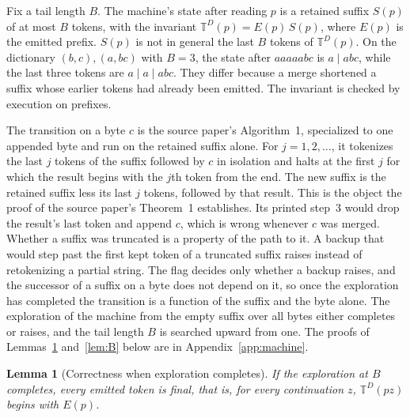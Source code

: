 \documentclass[11pt,a4paper]{article}
\theoremstyle{definition}
\theoremstyle{plain}
\newtheorem{lemma}{Lemma}
\newcommand{\T}{\mathbb{T}}
\begin{document}
Fix a tail length \(B\). The machine's state after reading \(p\) is a retained suffix \(S(p)\) of at most \(B\) tokens,
with the invariant \(\T^D(p) = E(p)\,S(p)\), where \(E(p)\) is the emitted prefix. \(S(p)\) is not in general the last
\(B\) tokens of \(\T^D(p)\). On the dictionary \((b,c), (a,bc)\) with \(B = 3\), the state after \(aaaaabc\) is
\(a \mid abc\), while the last three tokens are \(a \mid a \mid abc\). They differ because a merge shortened a suffix
whose earlier tokens had already been emitted. The invariant is checked by execution on \EmittedPrefixes{} prefixes.

The transition on a byte \(c\) is the source paper's Algorithm~1, specialized to one appended byte and run on the
retained suffix alone. For \(j = 1, 2, \dots\), it tokenizes the last \(j\) tokens of the suffix followed by \(c\) in
isolation and halts at the first \(j\) for which the result begins with the \(j\)th token from the end. The new suffix
is the retained suffix less its last \(j\) tokens, followed by that result. This is the object the proof of the source
paper's Theorem~1 establishes. Its printed step~3 would drop the result's last token and append \(c\), which is wrong
whenever \(c\) was merged. Whether a suffix was truncated is a property of the path to it. A backup that would step past
the first kept token of a truncated suffix raises instead of retokenizing a partial string. The flag decides only
whether a backup raises, and the successor of a suffix on a byte does not depend on it, so once the exploration has
completed the transition is a function of the suffix and the byte alone. The exploration of the machine from the empty
suffix over all bytes either completes or raises, and the tail length \(B\) is searched upward from one. The proofs of
Lemmas~\ref{lem:A} and~\ref{lem:B} below are in Appendix~\ref{app:machine}.


\begin{lemma}[Correctness when exploration completes]\label{lem:A}
If the exploration at \(B\) completes, every emitted token is final, that is, for every continuation \(z\), \(\T^D(pz)\)
begins with \(E(p)\).
\end{lemma}
\end{document}
